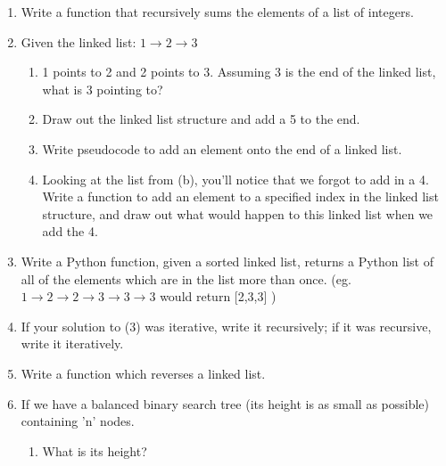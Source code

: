 \documentclass[11pt]{article}
\begin{document}

\begin{enumerate}
    \item Write a function that recursively sums the elements of a list of
          integers.
          \vspace{2.5in}

    \item Given the linked list: $1 \rightarrow 2 \rightarrow 3$
        \begin{enumerate}
            \item 1 points to 2 and 2 points to 3. Assuming 3 is the end of the linked list, what is 3 pointing to?
                \vspace{0.5in}
            \item Draw out the linked list structure and add a 5 to the end.
                \vspace{1.25in}
            \item Write pseudocode to add an element onto the end of a linked list.
                \vspace{3.5in}
            \pagebreak
            \item Looking at the list from (b), you'll notice that we forgot to
                  add in a 4. Write a function to add an element to a specified
		  index in the linked list structure, and draw out what would happen
		  to this linked list when we add the 4.
                \vspace{2.5in}
        \end{enumerate}
    \item Write a Python function, given a sorted linked list, returns a Python
    list of all of the elements which are in the list more than once. (eg.
    $1\rightarrow2\rightarrow2\rightarrow3\rightarrow3\rightarrow3$ would return [2,3,3] )
        \vspace{3in}
    \item If your solution to (3) was iterative, write it recursively; if it
    was recursive, write it iteratively.
        \pagebreak
    \item Write a function which reverses a linked list.
        \vspace{4in}
    \item If we have a balanced binary search tree (its height is as small as
    possible) containing 'n' nodes.
        \begin{enumerate}
            \item What is its height?

\end{enumerate}
\end{enumerate}
\end{document}

